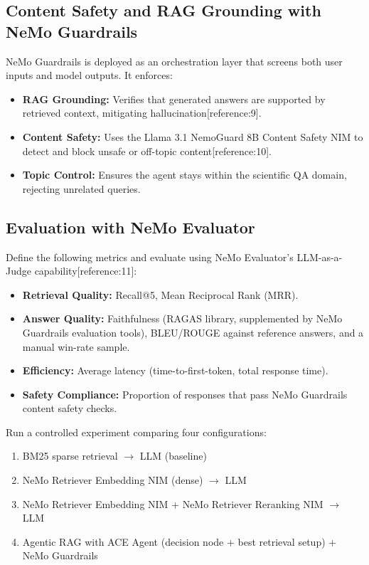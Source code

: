 \documentclass[a4paper,11pt]{article}
\begin{document}
\subsection{Content Safety and RAG Grounding with NeMo Guardrails}
NeMo Guardrails is deployed as an orchestration layer that screens both user inputs and model outputs. It enforces:
\begin{itemize}[noitemsep]
    \item \textbf{RAG Grounding:} Verifies that generated answers are supported by retrieved context, mitigating hallucination[reference:9].
    \item \textbf{Content Safety:} Uses the Llama 3.1 NemoGuard 8B Content Safety NIM to detect and block unsafe or off-topic content[reference:10].
    \item \textbf{Topic Control:} Ensures the agent stays within the scientific QA domain, rejecting unrelated queries.
\end{itemize}

\subsection{Evaluation with NeMo Evaluator}
Define the following metrics and evaluate using NeMo Evaluator's LLM-as-a-Judge capability[reference:11]:
\begin{itemize}[noitemsep]
    \item \textbf{Retrieval Quality:} Recall@5, Mean Reciprocal Rank (MRR).
    \item \textbf{Answer Quality:} Faithfulness (RAGAS library, supplemented by NeMo Guardrails evaluation tools), BLEU/ROUGE against reference answers, and a manual win-rate sample.
    \item \textbf{Efficiency:} Average latency (time-to-first-token, total response time).
    \item \textbf{Safety Compliance:} Proportion of responses that pass NeMo Guardrails content safety checks.
\end{itemize}

Run a controlled experiment comparing four configurations:
\begin{enumerate}[noitemsep,label=\alph*)]
    \item BM25 sparse retrieval $\rightarrow$ LLM (baseline)
    \item NeMo Retriever Embedding NIM (dense) $\rightarrow$ LLM
    \item NeMo Retriever Embedding NIM + NeMo Retriever Reranking NIM $\rightarrow$ LLM
    \item Agentic RAG with ACE Agent (decision node + best retrieval setup) + NeMo Guardrails
\end{enumerate}
\end{document}
